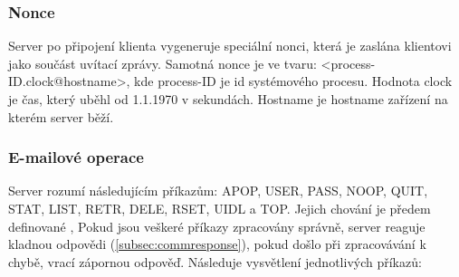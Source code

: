 \documentclass[11pt,a4paper]{report}
\begin{document}
    \subsubsection{Nonce}
    \label{subsec:nonce}
    Server po připojení klienta vygeneruje speciální nonci, která je zaslána klientovi jako součást uvítací zprávy.
    Samotná nonce je ve tvaru: <process-ID.clock@hostname>, kde process-ID je id systémového procesu. Hodnota clock je čas, který uběhl od 1.1.1970 v sekundách. Hostname je hostname zařízení na kterém server běží.
    \subsubsection{E-mailové operace}
    \label{subsec:mailoperations}
    Server rozumí následujícím příkazům: APOP, USER, PASS, NOOP, QUIT, STAT, LIST, RETR, DELE, RSET, UIDL a TOP. Jejich chování je předem definované \cite{P3Server}, Pokud jsou veškeré příkazy zpracovány správně, server reaguje kladnou odpovědi (\ref{subsec:commresponse}), pokud došlo při zpracovávání k chybě, vrací zápornou odpověď. Následuje vysvětlení jednotlivých příkazů:
\end{document}
